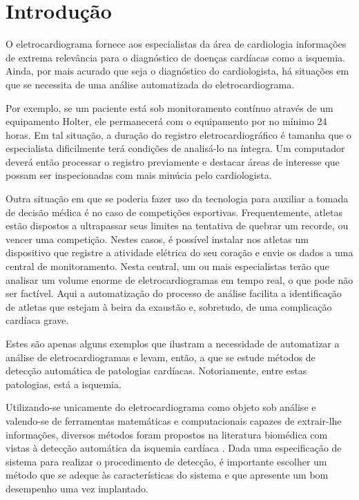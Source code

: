 
\chapter[Introdução]{Introdução}
\thispagestyle{empty}
\label{chap:intro}

O eletrocardiograma fornece aos especialistas da área de cardiologia informações de extrema relevância para o diagnóstico de doenças cardíacas como a isquemia. Ainda, por mais acurado que seja o diagnóstico do cardiologista, há situações em que se necessita de uma análise automatizada do eletrocardiograma.

Por exemplo, se um paciente está sob monitoramento contínuo através de um equipamento Holter, ele permanecerá com o equipamento por no mínimo 24 horas. Em tal situação, a duração do registro eletrocardiográfico é tamanha que o especialista dificilmente terá condições de analisá-lo na íntegra. Um computador deverá então processar o registro previamente e destacar áreas de interesse que possam ser inspecionadas com mais minúcia pelo cardiologista.

Outra situação em que se poderia fazer uso da tecnologia para auxiliar a tomada de decisão médica é no caso de competições esportivas. Frequentemente, atletas estão dispostos a ultrapassar seus limites na tentativa de quebrar um recorde, ou vencer uma competição. Nestes casos, é possível instalar nos atletas um dispositivo que registre a atividade elétrica do seu coração e envie os dados a uma central de monitoramento. Nesta central, um ou mais especialistas terão que analisar um volume enorme de eletrocardiogramas em tempo real, o que pode não ser factível. Aqui a automatização do processo de análise facilita a identificação de atletas que estejam à beira da exaustão e, sobretudo, de uma complicação cardíaca grave.

Estes são apenas alguns exemplos que ilustram a necessidade de automatizar a análise de eletrocardiogramas e levam, então, a que se estude métodos de detecção automática de patologias cardíacas. Notoriamente, entre estas patologias, está a isquemia.

Utilizando-se unicamente do eletrocardiograma como objeto sob análise e valendo-se de ferramentas matemáticas e computacionais capazes de extrair-lhe informações, diversos métodos foram propostos na literatura biomédica com vistas à detecção automática da isquemia cardíaca \cite{Rocha2010, Mohebbi2007, Gopalakrishnan2004, Papaloukas2001, Garcia2000, Goletsis2004, Afsar2007, Andreao2004, Badilini1992, Milosavljevic2006, Pang2005, Stamkopoulos1997}. Dada uma especificação de sistema para realizar o procedimento de detecção, é importante escolher um método que se adeque às características do sistema e que apresente um bom desempenho uma vez implantado.


